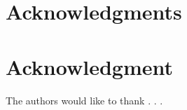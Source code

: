 \documentclass[10pt,journal,compsoc]{IEEEtran}
\begin{document}

%





\ifCLASSOPTIONcompsoc
  \section*{Acknowledgments}
\else
  \section*{Acknowledgment}
\fi

The authors would like to thank . . .
\end{document}
